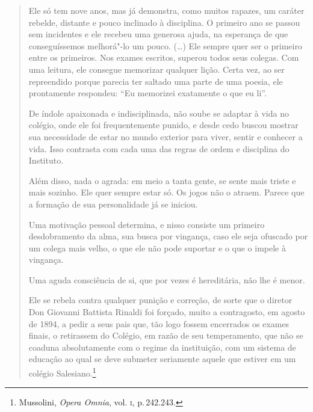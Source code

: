\begin{quote}
Ele só tem nove anos, mas já demonstra, como muitos rapazes, um caráter
rebelde, distante e pouco inclinado à disciplina. O primeiro ano se
passou sem incidentes e ele recebeu uma generosa ajuda, na esperança de
que conseguíssemos melhorá"-lo um pouco. (\ldots{}) Ele sempre quer ser o
primeiro entre os primeiros. Nos exames escritos, superou todos seus
colegas. Com uma leitura, ele consegue memorizar qualquer lição. Certa
vez, ao ser repreendido porque parecia ter saltado uma parte de uma
poesia, ele prontamente respondeu: ``Eu memorizei exatamente o que eu
li''.

De índole apaixonada e indisciplinada, não soube se adaptar à vida no
colégio, onde ele foi frequentemente punido, e desde cedo buscou mostrar
sua necessidade de estar no mundo exterior para viver, sentir e conhecer
a vida. Isso contrasta com cada uma das regras de ordem e disciplina do
Instituto.

Além disso, nada o agrada: em meio a tanta gente, se sente mais triste e
mais sozinho. Ele quer sempre estar só. Os jogos não o atraem. Parece
que a formação de sua personalidade já se iniciou.

Uma motivação pessoal determina, e nisso consiste um primeiro
desdobramento da alma, sua busca por vingança, caso ele seja ofuscado
por um colega mais velho, o que ele não pode suportar e o que o impele à
vingança.

Uma aguda consciência de si, que por vezes é hereditária, não lhe é
menor.

Ele se rebela contra qualquer punição e correção, de sorte que o diretor
Don Giovanni Battista Rinaldi foi forçado, muito a contragosto, em
agosto de 1894, a pedir a seus pais que, tão logo fossem encerrados os
exames finais, o retirassem do Colégio, em razão de seu temperamento,
que não se coaduna absolutamente com o regime da instituição, com um
sistema de educação ao qual se deve submeter seriamente aquele que
estiver em um colégio Salesiano.\footnote{Mussolini, \emph{Opera Omnia},
  vol. \textsc{i}, p.\,242.243.}
\end{quote}

